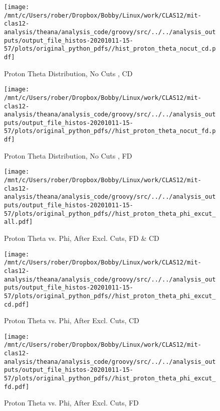 \documentclass{article}
\begin{document}
\begin{landscape}
    \begin{figure}[h]
        \centering

        \texttt{[image: /mnt/c/Users/rober/Dropbox/Bobby/Linux/work/CLAS12/mit-clas12-analysis/theana/analysis\_code/groovy/src/../../analysis\_outputs/output\_file\_histos-20201011-15-57/plots/original\_python\_pdfs//hist\_proton\_theta\_nocut\_cd.pdf]}
        \captionsetup{textformat=empty,labelformat=blank}
        \caption{Proton Theta Distribution, No Cuts , CD}
    \end{figure}
    \clearpage
    
    \begin{figure}[h]
        \centering

        \texttt{[image: /mnt/c/Users/rober/Dropbox/Bobby/Linux/work/CLAS12/mit-clas12-analysis/theana/analysis\_code/groovy/src/../../analysis\_outputs/output\_file\_histos-20201011-15-57/plots/original\_python\_pdfs//hist\_proton\_theta\_nocut\_fd.pdf]}
        \captionsetup{textformat=empty,labelformat=blank}
        \caption{Proton Theta Distribution, No Cuts , FD}
    \end{figure}
    \clearpage
    
    \begin{figure}[h]
        \centering

        \texttt{[image: /mnt/c/Users/rober/Dropbox/Bobby/Linux/work/CLAS12/mit-clas12-analysis/theana/analysis\_code/groovy/src/../../analysis\_outputs/output\_file\_histos-20201011-15-57/plots/original\_python\_pdfs//hist\_proton\_theta\_phi\_excut\_all.pdf]}
        \captionsetup{textformat=empty,labelformat=blank}
        \caption{Proton Theta vs. Phi, After Excl. Cuts, FD \& CD}
    \end{figure}
    \clearpage
    
    \begin{figure}[h]
        \centering

        \texttt{[image: /mnt/c/Users/rober/Dropbox/Bobby/Linux/work/CLAS12/mit-clas12-analysis/theana/analysis\_code/groovy/src/../../analysis\_outputs/output\_file\_histos-20201011-15-57/plots/original\_python\_pdfs//hist\_proton\_theta\_phi\_excut\_cd.pdf]}
        \captionsetup{textformat=empty,labelformat=blank}
        \caption{Proton Theta vs. Phi, After Excl. Cuts, CD}
    \end{figure}
    \clearpage
    
    \begin{figure}[h]
        \centering

        \texttt{[image: /mnt/c/Users/rober/Dropbox/Bobby/Linux/work/CLAS12/mit-clas12-analysis/theana/analysis\_code/groovy/src/../../analysis\_outputs/output\_file\_histos-20201011-15-57/plots/original\_python\_pdfs//hist\_proton\_theta\_phi\_excut\_fd.pdf]}
        \captionsetup{textformat=empty,labelformat=blank}
        \caption{Proton Theta vs. Phi, After Excl. Cuts, FD}
    \end{figure}
    \clearpage
    

\end{landscape}
\end{document}
